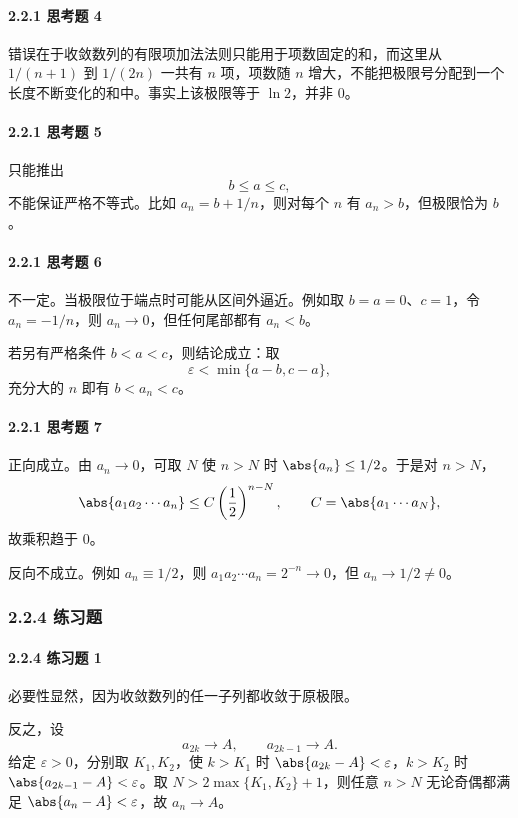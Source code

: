 \paragraph{2.2.1 思考题 4}
\begin{xsolution}
错误在于收敛数列的有限项加法法则只能用于项数固定的和，而这里从 $1/(n+1)$ 到 $1/(2n)$ 一共有 $n$ 项，项数随 $n$ 增大，不能把极限号分配到一个长度不断变化的和中。事实上该极限等于 $\ln2$，并非 $0$。
\end{xsolution}

\paragraph{2.2.1 思考题 5}
\begin{xsolution}
只能推出
\[
  b\le a\le c,
\]
不能保证严格不等式。比如 $a_n=b+1/n$，则对每个 $n$ 有 $a_n>b$，但极限恰为 $b$。
\end{xsolution}

\paragraph{2.2.1 思考题 6}
\begin{xsolution}
不一定。当极限位于端点时可能从区间外逼近。例如取 $b=a=0$、$c=1$，令 $a_n=-1/n$，则 $a_n\to0$，但任何尾部都有 $a_n<b$。

若另有严格条件 $b<a<c$，则结论成立：取
\[
  \varepsilon<\min\{a-b,c-a\},
\]
充分大的 $n$ 即有 $b<a_n<c$。
\end{xsolution}

\paragraph{2.2.1 思考题 7}
\begin{xsolution}
正向成立。由 $a_n\to0$，可取 $N$ 使 $n>N$ 时 $\abs{a_n}\le1/2$。于是对 $n>N$，
\[
  \abs{a_1a_2\cdots a_n}
  \le C\left(\frac12\right)^{n-N},
  \qquad
  C=\abs{a_1\cdots a_N},
\]
故乘积趋于 $0$。

反向不成立。例如 $a_n\equiv1/2$，则 $a_1a_2\cdots a_n=2^{-n}\to0$，但 $a_n\to1/2\ne0$。
\end{xsolution}

\subsubsection*{2.2.4 练习题}

\paragraph{2.2.4 练习题 1}
\begin{xsolution}
必要性显然，因为收敛数列的任一子列都收敛于原极限。

反之，设
\[
  a_{2k}\to A,\qquad a_{2k-1}\to A.
\]
给定 $\varepsilon>0$，分别取 $K_1,K_2$，使 $k>K_1$ 时 $\abs{a_{2k}-A}<\varepsilon$，$k>K_2$ 时 $\abs{a_{2k-1}-A}<\varepsilon$。取 $N>2\max\{K_1,K_2\}+1$，则任意 $n>N$ 无论奇偶都满足 $\abs{a_n-A}<\varepsilon$，故 $a_n\to A$。
\end{xsolution}

